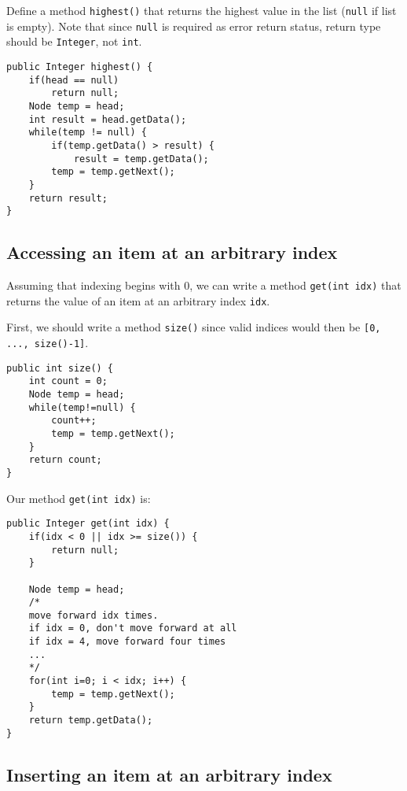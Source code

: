 \begin{exercise}[8]
Define a method \texttt{highest()} that returns the highest value in the list (\texttt{null} if list is empty). Note that since \texttt{null} is required as error return status, return type should be \texttt{Integer}, not \texttt{int}.
\end{exercise}
\begin{answer}
\begin{lstlisting}
public Integer highest() {
	if(head == null)
		return null;
	Node temp = head;
	int result = head.getData();
	while(temp != null) {
		if(temp.getData() > result) {
			result = temp.getData();
		temp = temp.getNext();
	}
	return result;
}
\end{lstlisting}	
\end{answer}

\newpage

\subsection{Accessing an item at an arbitrary index}

Assuming that indexing begins with 0, we can write a method \texttt{get(int idx)} that returns the value of an item at an arbitrary index \texttt{idx}.

First, we should write a method \texttt{size()} since valid indices would then be \texttt{[0, ..., size()-1]}.

\begin{lstlisting}
public int size() {
	int count = 0;
	Node temp = head;
	while(temp!=null) {
		count++;
		temp = temp.getNext();
	}
	return count;
}
\end{lstlisting}

Our method \texttt{get(int idx)} is:

\begin{lstlisting}
public Integer get(int idx) {
	if(idx < 0 || idx >= size()) {
		return null;
	}
	
	Node temp = head;
	/*
	move forward idx times. 
	if idx = 0, don't move forward at all
	if idx = 4, move forward four times
	...
	*/
	for(int i=0; i < idx; i++) {
		temp = temp.getNext();
	}
	return temp.getData();
}
\end{lstlisting}

\subsection{Inserting an item at an arbitrary index}

